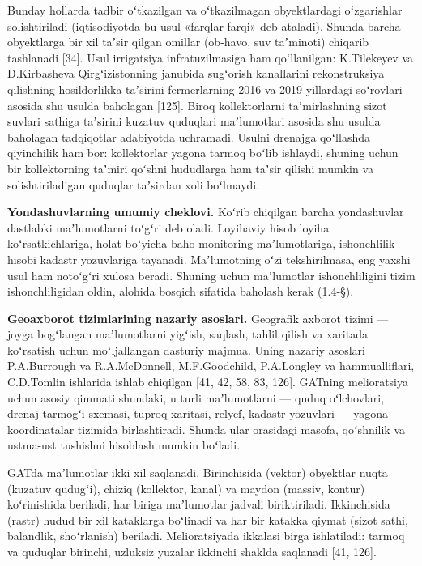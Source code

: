 Bunday hollarda tadbir oʻtkazilgan va oʻtkazilmagan obyektlardagi
oʻzgarishlar solishtiriladi (iqtisodiyotda bu usul «farqlar farqi» deb
ataladi). Shunda barcha obyektlarga bir xil taʼsir qilgan omillar
(ob-havo, suv taʼminoti) chiqarib tashlanadi {[}34{]}. Usul irrigatsiya
infratuzilmasiga ham qoʻllanilgan: K.Tilekeyev va D.Kirbasheva
Qirgʻizistonning janubida sugʻorish kanallarini rekonstruksiya
qilishning hosildorlikka taʼsirini fermerlarning 2016 va 2019-yillardagi
soʻrovlari asosida shu usulda baholagan {[}125{]}. Biroq kollektorlarni
taʼmirlashning sizot suvlari sathiga taʼsirini kuzatuv quduqlari
maʼlumotlari asosida shu usulda baholagan tadqiqotlar adabiyotda
uchramadi. Usulni drenajga qoʻllashda qiyinchilik ham bor: kollektorlar
yagona tarmoq boʻlib ishlaydi, shuning uchun bir kollektorning taʼmiri
qoʻshni hududlarga ham taʼsir qilishi mumkin va solishtiriladigan
quduqlar taʼsirdan xoli boʻlmaydi.

\textbf{Yondashuvlarning umumiy cheklovi.} Koʻrib chiqilgan barcha
yondashuvlar dastlabki maʼlumotlarni toʻgʻri deb oladi. Loyihaviy hisob
loyiha koʻrsatkichlariga, holat boʻyicha baho monitoring maʼlumotlariga,
ishonchlilik hisobi kadastr yozuvlariga tayanadi. Maʼlumotning oʻzi
tekshirilmasa, eng yaxshi usul ham notoʻgʻri xulosa beradi. Shuning
uchun maʼlumotlar ishonchliligini tizim ishonchliligidan oldin, alohida
bosqich sifatida baholash kerak (1.4-§).


\textbf{Geoaxborot tizimlarining nazariy asoslari.} Geografik axborot
tizimi --- joyga bogʻlangan maʼlumotlarni yigʻish, saqlash, tahlil
qilish va xaritada koʻrsatish uchun moʻljallangan dasturiy majmua. Uning
nazariy asoslari P.A.Burrough va R.A.McDonnell, M.F.Goodchild,
P.A.Longley va hammualliflari, C.D.Tomlin ishlarida ishlab chiqilgan
{[}41, 42, 58, 83, 126{]}. GATning melioratsiya uchun asosiy qimmati
shundaki, u turli maʼlumotlarni --- quduq oʻlchovlari, drenaj tarmogʻi
sxemasi, tuproq xaritasi, relyef, kadastr yozuvlari --- yagona
koordinatalar tizimida birlashtiradi. Shunda ular orasidagi masofa,
qoʻshnilik va ustma-ust tushishni hisoblash mumkin boʻladi.

GATda maʼlumotlar ikki xil saqlanadi. Birinchisida (vektor) obyektlar
nuqta (kuzatuv qudugʻi), chiziq (kollektor, kanal) va maydon (massiv,
kontur) koʻrinishida beriladi, har biriga maʼlumotlar jadvali
biriktiriladi. Ikkinchisida (rastr) hudud bir xil kataklarga boʻlinadi
va har bir katakka qiymat (sizot sathi, balandlik, shoʻrlanish)
beriladi. Melioratsiyada ikkalasi birga ishlatiladi: tarmoq va quduqlar
birinchi, uzluksiz yuzalar ikkinchi shaklda saqlanadi {[}41, 126{]}.

